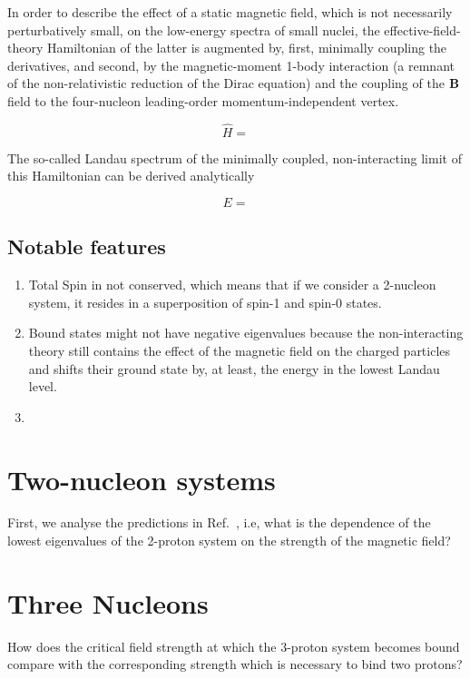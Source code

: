 \documentclass[
reprint,
onecolumn,
nofootinbib,
amsmath,amssymb,
aps,
]{revtex4-2}
\newcommand{\la}[1] {\label{#1}}
\newcommand{\be} {\begin{equation}}
\newcommand{\ee} {\end{equation}}
\begin{document}
In order to describe the effect of a static magnetic field, which is not necessarily
perturbatively small, on the low-energy spectra of small nuclei, the 
effective-field-theory Hamiltonian of the latter is augmented by, first, minimally coupling
the derivatives, and second, by the magnetic-moment 1-body interaction (a remnant of the
non-relativistic reduction of the Dirac equation) and the coupling of the $\vb{B}$ field
to the four-nucleon leading-order momentum-independent vertex.

\be\la{eq.hamiltonian}
\hat{H}=
\ee

The so-called Landau spectrum of the minimally coupled, non-interacting limit of this 
Hamiltonian can be derived analytically

\be\la{eq.landau_spect}
E=
\ee

\subsection{Notable features}

\begin{enumerate}
\item Total Spin in not conserved, which means that if we consider a 2-nucleon
system, it resides in a superposition of spin-1 and spin-0 states.
\item Bound states might not have negative eigenvalues because the non-interacting
theory still contains the effect of the magnetic field on the charged particles
and shifts their ground state by, at least, the energy in the lowest Landau level.
\item
\end{enumerate}

\section{Two-nucleon systems}

First, we analyse the predictions in Ref.~\cite{PhysRevLett.116.112301}, i.e, what is
the dependence of the lowest eigenvalues of the 2-proton system on the strength of the
magnetic field?

\section{Three Nucleons}

How does the critical field strength at which the 3-proton system becomes bound compare
with the corresponding strength which is necessary to bind two protons?
\end{document}
